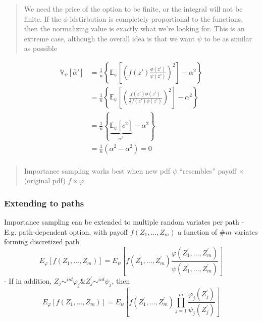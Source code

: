 \documentclass[
  oneside]{book}
\begin{document}
\begin{quote}
We need the price of the option to be finite, or the integral will not be finite. If the \(\phi\) idstirbution is completely proportional to the functions, then the normalizing value is exactly what we're looking for. This is an extreme case, although the overall idea is that we want \(\psi\) to be as similar as possible
\end{quote}

\[
\begin{aligned}
\mathbb{V}_{\psi} [\hat{\alpha}'] &= \frac{1}{n} \left\{ \mathbb{E}_{\psi} \left[ \left( f(z') \frac{\phi(z')}{\psi(z')} \right)^{2}  \right]  -\alpha^{2} \right\} \\
&= \frac{1}{n} \left\{ \mathbb{E}_{\psi} \left[ \left( \frac{f(z')\phi(z')}{\frac{1}{c} f(z')\phi(z')} \right)^{2}  \right] -\alpha^{2} \right\}\\
&= \frac{1}{n} \left\{ \underbrace{ \mathbb{E}_{\psi} \left[ c^{2}\right] }_{ \alpha^{2} } -\alpha^{2} \right\}\\
&= \frac{1}{n} \left( \alpha^{2} -\alpha^{2}\right) =0\\
\end{aligned}
\]

\begin{quote}
Importance sampling works best when new pdf \(\psi\) ``resembles'' payoff \(\times\) (original pdf) \(f \times \varphi\)
\end{quote}

\hypertarget{extending-to-paths}{%
\subsubsection{Extending to paths}\label{extending-to-paths}}

Importance sampling can be extended to multiple random variates per path
- E.g. path-dependent option, with payoff \(f\left(Z_1, \ldots, Z_m\right)\) a function of \(\# m\) variates forming discretized path
\[
E_{\varphi}\left[f\left(Z_1, \ldots, Z_m\right)\right]=E_\psi\left[f\left(Z_1^{\prime}, \ldots, Z_m^{\prime}\right) \frac{\varphi\left(Z_1^{\prime}, \ldots, Z_m^{\prime}\right)}{\psi\left(Z_1^{\prime}, \ldots, Z_m^{\prime}\right)}\right]
\]
- If in addition, \(Z_j \sim^{i i d} \varphi_j \& Z_j^{\prime} \sim^{i i d} \psi_j\), then
\[
E_{\varphi}\left[f\left(Z_1, \ldots, Z_m\right)\right]=E_\psi\left[f\left(Z_1^{\prime}, \ldots, Z_m^{\prime}\right) \prod_{j=1}^m \frac{\varphi_j\left(Z_j^{\prime}\right)}{\psi_j\left(Z_j^{\prime}\right)}\right]
\]
\end{document}
